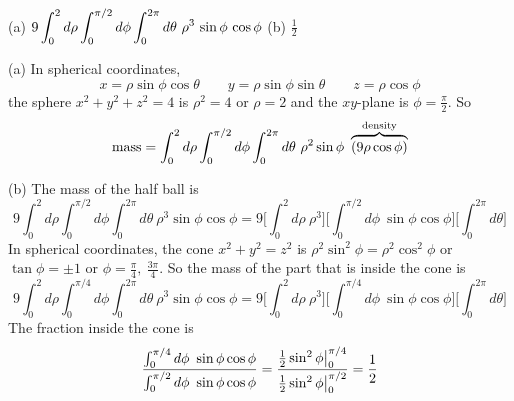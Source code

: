 %

\begin{answer}
(a) $\dst 9\int_0^2d\rho\int_0^{\pi/2}d\phi\int_0^{2\pi}d\theta\ 
            \rho^3\,\sin\phi\,\cos\phi$\qquad
(b) $\frac{1}{2}$
\end{answer}

\begin{solution}
(a) In spherical coordinates,
\begin{equation*}
x=\rho\sin\phi\cos\theta\qquad y=\rho\sin\phi\sin\theta\qquad z=\rho\cos\phi
\end{equation*}
the sphere $x^2+y^2+z^2=4$ is $\rho^2=4$ or $\rho=2$ and the 
$xy$-plane is $\phi=\frac{\pi}{2}$. So
\begin{equation*}
\text{mass}
=\int_0^2d\rho\int_0^{\pi/2}d\phi\int_0^{2\pi}d\theta\ \rho^2\sin\phi
\ \overbrace{(9 \rho\cos\phi)}^{\rm density}
\end{equation*}

(b) The mass of the half ball is
\begin{equation*}
9 \int_0^2d\rho\int_0^{\pi/2}d\phi\int_0^{2\pi}d\theta\ \rho^3\sin\phi \cos\phi
=9 \bigg[\int_0^2d\rho\ \rho^3\bigg]
  \bigg[\int_0^{\pi/2}d\phi\ \sin\phi \cos\phi\bigg]
  \bigg[\int_0^{2\pi}d\theta\bigg]
\end{equation*}
In spherical coordinates, the 
cone $x^2+y^2=z^2$ is $\rho^2\sin^2\phi=\rho^2\cos^2\phi$ or 
$\tan\phi=\pm1$ or $\phi=\frac{\pi}{4},\ \frac{3\pi}{4}$. So the mass
of the part that is inside the cone is
\begin{equation*}
9 \int_0^2d\rho\int_0^{\pi/4}d\phi\int_0^{2\pi}d\theta\ \rho^3\sin\phi \cos\phi
=9 \bigg[\int_0^2d\rho\ \rho^3\bigg]
  \bigg[\int_0^{\pi/4}d\phi\ \sin\phi \cos\phi\bigg]
  \bigg[\int_0^{2\pi}d\theta\bigg]
\end{equation*}
The fraction inside the cone is
\begin{equation*}
\frac{\int_0^{\pi/4}d\phi\ \sin\phi \cos\phi}{\int_0^{\pi/2}d\phi\ \sin\phi \cos\phi}
=\frac{\tfrac{1}{2}\sin^2\phi\big|_0^{\pi/4}}{\tfrac{1}{2}\sin^2\phi\big|_0^{\pi/2}}
=\frac{1}{2}
\end{equation*}
\end{solution}



\subsection*{\Application}

